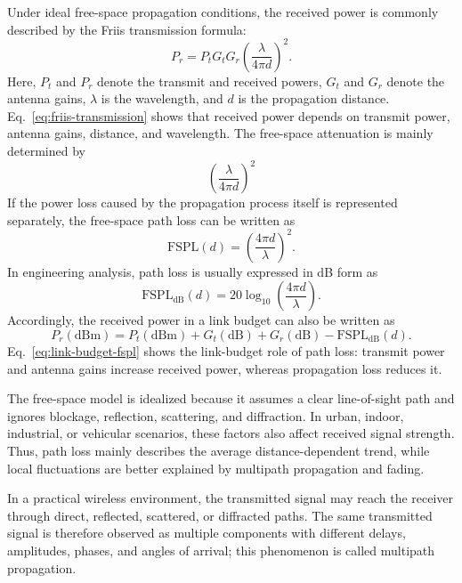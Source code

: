 Under ideal free-space propagation conditions,
the received power is commonly described by the Friis transmission formula:
\begin{equation}
    P_r
    =
    P_t G_t G_r
    \left(
        \frac{\lambda}{4\pi d}
    \right)^2 .
    \label{eq:friis-transmission}
\end{equation}
Here, \(P_t\) and \(P_r\) denote the transmit and received powers,
\(G_t\) and \(G_r\) denote the antenna gains, \(\lambda\) is the wavelength,
and \(d\) is the propagation distance.
Eq.~\eqref{eq:friis-transmission} shows that received power depends on
transmit power, antenna gains, distance, and wavelength.
The free-space attenuation is mainly determined by
\[
    \left(
        \frac{\lambda}{4\pi d}
    \right)^2
\]
If the power loss caused by the propagation process itself is represented separately,
the free-space path loss can be written as
\begin{equation}
    \mathrm{FSPL}(d)
    =
    \left(
        \frac{4\pi d}{\lambda}
    \right)^2 .
    \label{eq:free-space-path-loss-linear}
\end{equation}
In engineering analysis,
path loss is usually expressed in dB form as
\begin{equation}
    \mathrm{FSPL}_{\mathrm{dB}}(d)
    =
    20\log_{10}
    \left(
        \frac{4\pi d}{\lambda}
    \right).
    \label{eq:free-space-path-loss-db}
\end{equation}
Accordingly,
the received power in a link budget can also be written as
\begin{equation}
    P_r(\mathrm{dBm})
    =
    P_t(\mathrm{dBm})
    +
    G_t(\mathrm{dB})
    +
    G_r(\mathrm{dB})
    -
    \mathrm{FSPL}_{\mathrm{dB}}(d).
    \label{eq:link-budget-fspl}
\end{equation}
Eq.~\eqref{eq:link-budget-fspl} shows the link-budget role of path loss:
transmit power and antenna gains increase received power, whereas propagation
loss reduces it.

The free-space model is idealized because it assumes a clear line-of-sight
path and ignores blockage, reflection, scattering, and diffraction.
In urban, indoor, industrial, or vehicular scenarios, these factors also affect
received signal strength.
Thus, path loss mainly describes the average distance-dependent trend, while
local fluctuations are better explained by multipath propagation and fading.


In a practical wireless environment, the transmitted signal may reach the
receiver through direct, reflected, scattered, or diffracted paths.
The same transmitted signal is therefore observed as multiple components with
different delays, amplitudes, phases, and angles of arrival; this phenomenon is
called multipath propagation.

